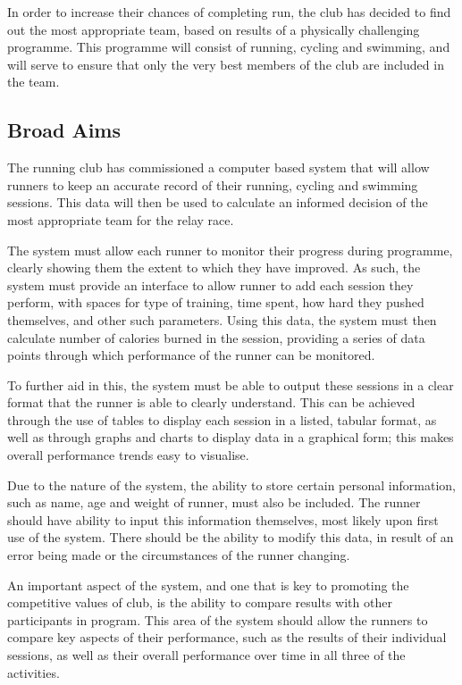\documentclass{article}[12pt,a4paper]
\begin{document}
In order to increase their chances of completing run, the club has decided to find out the most appropriate team, based on results of a physically challenging programme. This programme will consist of running, cycling and swimming, and will serve to ensure that only the very best members of the club are included in the team.

\subsection{Broad Aims}
The running club has commissioned  a computer based system that will allow runners to keep an accurate record of their running, cycling and swimming sessions. This data will then be used to calculate an informed decision of the most appropriate team for the relay race.

The system must allow each runner to monitor their progress during programme, clearly showing them the extent to which they have improved. As such, the system must provide an interface to allow runner to add each session they perform, with spaces for type of training, time spent, how hard they pushed themselves, and other such parameters. Using this data, the system must then calculate number of calories burned in the session, providing a series of data points through which performance of the runner can be monitored.

To further aid in this, the system must be able to output these sessions in a clear format that the runner is able to clearly understand. This can be achieved through the use of tables to display each session in a listed, tabular format, as well as through graphs and charts to display data in a graphical form; this makes overall performance trends easy to visualise.

Due to the nature of the system, the ability to store certain personal information, such as name, age and weight of runner, must also be included. The runner should have ability to input this information themselves, most likely upon first use of the system. There should be the ability to modify this data, in result of an error being made or the circumstances of the runner changing.

An important aspect of the system, and one that is key to promoting the competitive values of club, is the ability to compare results with other participants in program. This area of the system should allow the runners to compare key aspects of their performance, such as the results of their individual sessions, as well as their overall performance over time in all three of the activities.
\end{document}
